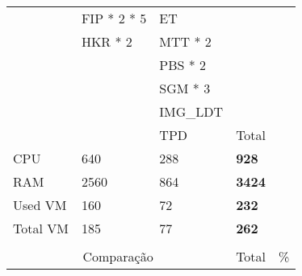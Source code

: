 \begin{table}[H]
\begin{tabular}{|l|l|l|l|l|}
    & \cellcolor[HTML]{A9D08E}FIP * 2 * 5                   & \cellcolor[HTML]{BDD7EE}ET                            &               &               \\ \cline{1-4} 
    & \cellcolor[HTML]{A9D08E}HKR * 2                       & \cellcolor[HTML]{BDD7EE}MTT * 2                       &               &               \\ \cline{1-4} 
    &                                                       & \cellcolor[HTML]{BDD7EE}PBS * 2                       &               &               \\ \cline{1-4} 
    &                                                       & \cellcolor[HTML]{BDD7EE}SGM * 3                       &               &               \\ \cline{1-4} 
    &                                                       & \cellcolor[HTML]{BDD7EE}IMG\_LDT                       &               &               \\ \cline{1-4} 
    &                                                       & \cellcolor[HTML]{BDD7EE}TPD                           & Total         &               \\ \cline{1-4}
    \cellcolor[HTML]{C0C0C0}CPU                             & 640                                                     & 288                                                     & \textbf{928}  &               \\ \cline{1-4}
    \cellcolor[HTML]{C0C0C0}RAM                             & 2560                                                    & 864                                                     & \textbf{3424} &               \\ \cline{1-4}
    \cellcolor[HTML]{C0C0C0}Used VM                         & 160                                                     & 72                                                      & \textbf{232}  &               \\ \cline{1-4}
    \cellcolor[HTML]{C0C0C0}Total VM                        & 185                                                     & 77                                                      & \textbf{262}  &               \\ \cline{1-4}
      &                                              &                                              &               &               \\ \cline{1-5}
    \multicolumn{3}{c}{\cellcolor[HTML]{C0C0C0}Comparação}                       & Total         & \%            \\ \cline{1-5}

\end{tabular}
\end{table}
